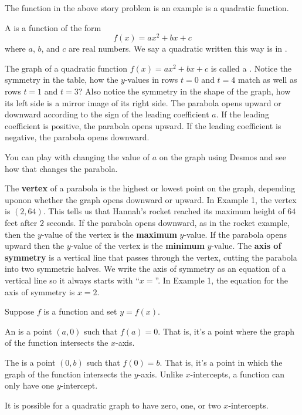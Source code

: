 \documentclass{ximera}
\begin{document}
The function in the above story problem is an example is a quadratic function.  

\begin{definition}
A  is a function of the form
\[
f(x)=ax^2+bx+c
\]
where $a$, $b$, and $c$ are real numbers.  We say a quadratic written this way is in .
\end{definition}

  The graph of a quadratic function $f(x)=ax^2+bx+c$ is called a .   
      Notice the symmetry in the table,
      how the $y$-values in rows $t=0$ and $t=4$ match as well as rows $t=1$ and $t=3$? 
      Also notice the symmetry in the shape of the graph,
      how its left side is a mirror image of its right side.
 The parabola opens upward or downward
        according to the sign of the leading coefficient $a$.
        If the leading coefficient is positive,
        the parabola opens upward.
        If the leading coefficient is negative,
        the parabola opens downward.



You can play with changing the value of $a$ on the graph using Desmos and see how that changes the parabola.  

\begin{center}  
\end{center}

 The \textbf{vertex}
      of a parabola is the highest or lowest point on the graph,
      depending uponon whether the graph opens downward or upward.
      In Example 1, the vertex is $(2,64)$.
      This tells us that Hannah's rocket reached its maximum height of $64$ feet after $2$ seconds.
      If the parabola opens downward, as in the rocket example,
      then the $y$-value of the vertex is the \textbf{maximum} $y$-value.
      If the parabola opens upward then the $y$-value of the vertex is the \textbf{minimum} $y$-value.
      The \textbf{axis of symmetry}
      is a vertical line that passes through the vertex, cutting the parabola into two symmetric halves.
      We write the axis of symmetry as an equation of a vertical line so it always starts with ``$x=$''.
      In Example 1, the equation for the axis of symmetry is $x=2$.
  
\begin{definition}[Intercepts]
	Suppose $f$ is a function and set $y=f(x)$.

	An  is a point $(a,0)$ such that $f(a) = 0$. That is, it's a 
	point where the graph of the function intersects the $x$-axis. 

	The  is a point $(0,b)$ such that $f(0) = b$. That is, it's a 
	point in which the graph of the function intersects the $y$-axis. Unlike 
	$x$-intercepts, a function can only have one $y$-intercept.
\end{definition}
      It is possible for a quadratic graph to have zero, one, or two $x$-intercepts.
\end{document}
